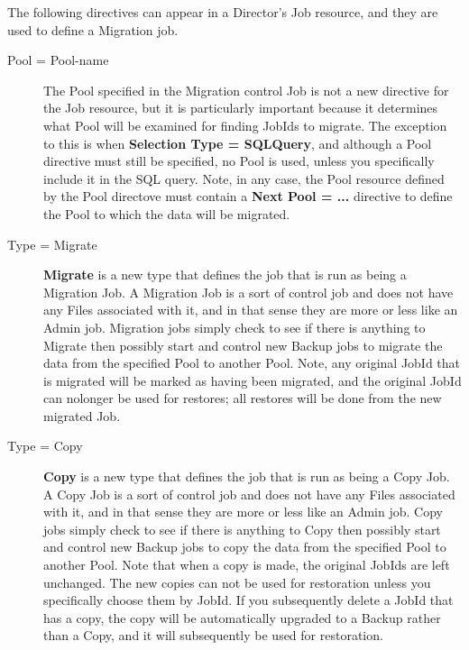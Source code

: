The following directives can appear in a Director's Job resource, and they
are used to define a Migration job.          

\begin{description}
\item [Pool = \lt{}Pool-name\gt{}] The Pool specified in the Migration
   control Job is not a new directive for the Job resource, but it is
   particularly important because it determines what Pool will be examined
   for finding JobIds to migrate.  The exception to this is when {\bf
   Selection Type = SQLQuery}, and although a Pool directive must still be
   specified, no Pool is used, unless you specifically include it in the
   SQL query.  Note, in any case, the Pool resource defined by the Pool 
   directove must contain a {\bf Next Pool = ...} directive to define the
   Pool to which the data will be migrated.

\item [Type = Migrate]
   {\bf Migrate} is a new type that defines the job that is run as being a
   Migration Job.  A Migration Job is a sort of control job and does not have
   any Files associated with it, and in that sense they are more or less like
   an Admin job.  Migration jobs simply check to see if there is anything to
   Migrate then possibly start and control new Backup jobs to migrate the data
   from the specified Pool to another Pool.  Note, any original JobId that
   is migrated will be marked as having been migrated, and the original
   JobId can nolonger be used for restores; all restores will be done from
   the new migrated Job.


\item [Type = Copy]
   {\bf Copy} is a new type that defines the job that is run as being a
   Copy Job.  A Copy Job is a sort of control job and does not have
   any Files associated with it, and in that sense they are more or less like
   an Admin job.  Copy jobs simply check to see if there is anything to
   Copy then possibly start and control new Backup jobs to copy the data
   from the specified Pool to another Pool.  Note that when a copy is
   made, the original JobIds are left unchanged. The new copies can not
   be used for restoration unless you specifically choose them by JobId.
   If you subsequently delete a JobId that has a copy, the copy will be
   automatically upgraded to a Backup rather than a Copy, and it will
   subsequently be used for restoration.
 

\end{description}
